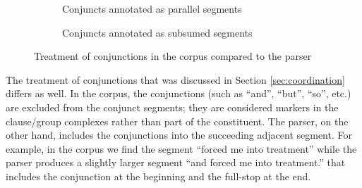     \begin{figure}[!ht]
        \centering
        \begin{subfigure}[b]{0.47\textwidth}
            \centering
            \caption{Conjuncts annotated as parallel segments}
            \label{fig:segment-conjunction-paralel}
        \end{subfigure}
        \quad
        \begin{subfigure}[b]{0.47\textwidth}
            \centering
            \caption{Conjuncts annotated as subsumed segments}
            \label{fig:segment-conjunction-subsumed}
        \end{subfigure}
        \caption{Treatment of conjunctions in the corpus compared to the parser}
        \label{fig:conjunction-treatment}
    \end{figure}
    
    The treatment of conjunctions that was discussed in Section \ref{sec:coordination} differs as well. In the corpus, the conjunctions (such as ``and'', ``but'', ``so'', etc.) are excluded from the conjunct segments; they are considered markers in the clause/group complexes rather than part of the constituent. The parser, on the other hand, includes the conjunctions into the succeeding adjacent segment. For example, in the corpus we find the segment ``forced me into treatment'' while the parser produces a slightly larger segment ``and forced me into treatment.'' that includes the conjunction at the beginning and the full-stop at the end.
    
